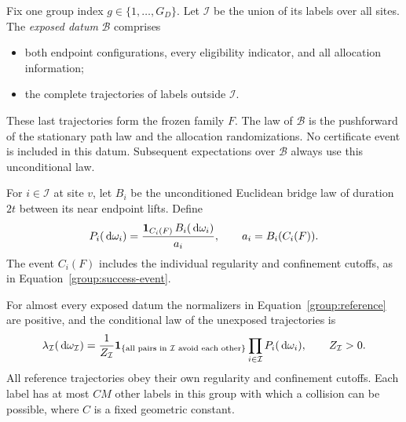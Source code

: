 Fix one group index $g\in\{1,\ldots,G_D\}$.  Let
$\mathcal I$ be the union of its labels over all sites.
The \emph{exposed datum} $\mathcal B$ comprises
\begin{itemize}
 \item both endpoint configurations, every eligibility indicator,
 and all allocation information;
 \item the complete trajectories of labels outside $\mathcal I$.
\end{itemize}
These last trajectories form the frozen family $F$.
The law of $\mathcal B$ is the pushforward of the stationary path law
and the allocation randomizations.  No certificate event is included
in this datum.  Subsequent expectations over $\mathcal B$ always use
this unconditional law.

For $i\in\mathcal I$ at site $v$, let $B_i$ be the unconditioned
Euclidean bridge law of duration $2t$ between its near endpoint lifts.
Define
\begin{equation}\label{group:reference}
 P_i(\,\mathrm d\omega_i)=
 \frac{\mathbf 1_{C_i(F)}\,B_i(\,\mathrm d\omega_i)}{a_i},
 \qquad a_i=B_i(C_i(F)).
\end{equation}
The event $C_i(F)$ includes the individual regularity and confinement
cutoffs, as in Equation~\eqref{group:success-event}.

\begin{proposition}\label{group:conditional-law}
For almost every exposed datum the normalizers in
Equation~\eqref{group:reference} are positive, and the conditional law
of the unexposed trajectories is
\begin{equation}\label{group:product-law}
 \lambda_{\mathcal I}(\,\mathrm d\omega_{\mathcal I})
 =\frac{1}{Z_{\mathcal I}}
   \mathbf 1_{\{\text{all pairs in $\mathcal I$ avoid each other}\}}
   \prod_{i\in\mathcal I}P_i(\,\mathrm d\omega_i),
 \qquad Z_{\mathcal I}>0.
\end{equation}
All reference trajectories obey their own regularity and confinement
cutoffs.  Each label has at most $C M$ other labels in this group with
which a collision can be possible, where $C$ is a fixed geometric
constant.
\end{proposition}

